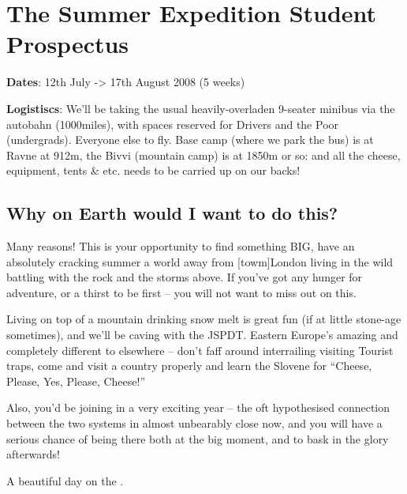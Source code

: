 \section{The Summer Expedition Student Prospectus}

\textbf{Dates}: 12th July -> 17th August 2008 (5 weeks)


\textbf{Logistiscs}: We'll be taking the usual heavily-overladen 9-seater
minibus via the autobahn (1000miles), with spaces reserved for
Drivers and the Poor (undergrads). Everyone else to fly.
Base camp (where we park the bus) is at Ravne at 912m, the
Bivvi (mountain camp) is at 1850m or so: and all the cheese,
equipment, tents \& etc. needs to be carried up on our backs!

\subsection{Why on Earth would I want to do this?}

Many reasons! This is your opportunity to find something BIG, have an absolutely cracking summer a world away from [towm]London living in the wild battling with the rock and the storms above. If you've got any hunger for adventure, or a thirst to be first – you will not want to miss out on this.

Living on top of a mountain drinking snow melt is great fun (if at little stone-age sometimes), and we'll be
caving with the JSPDT. Eastern Europe's amazing and completely different to elsewhere – don't faff around
interrailing visiting Tourist traps, come and visit a country properly and learn the Slovene for “Cheese, Please, Yes, Please, Cheese!”

Also, you'd be joining in a very exciting year – the oft hypothesised connection between the two systems in almost unbearably close now, and you will have a serious chance of being there both at the big moment, and to bask in the glory afterwards!

\begin{pagefigure}
\checkoddpage \ifoddpage \forcerectofloat \else \forceversofloat \fi
\centering
{}
\caption{A beautiful day on the . } \label{tents}
\end{pagefigure}
